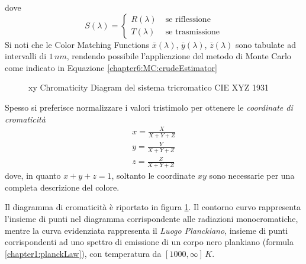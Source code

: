 dove
\begin{equation}\label{chapter2:colorimetry:spectrum2XYZ4Rad}
	S(\lambda) = \left\{ \begin{aligned}
		R(\lambda)\;&\text{se riflessione}\\
		T(\lambda)\;&\text{se trasmissione}
	\end{aligned}\right.
\end{equation}
Si noti che le Color Matching Functions $\bar{x}(\lambda)$, $\bar{y}(\lambda)$, $\bar{z}(\lambda)$ sono tabulate ad intervalli di $1\,\si{nm}$, 
rendendo possibile l'applicazione del metodo di Monte Carlo come indicato in Equazione \ref{chapter6:MC:crudeEstimator}
\begin{figure}[tb]
	
	\caption{xy Chromaticity Diagram del sistema tricromatico CIE XYZ 1931}
	\label{chapter2:colorimetry:cromaticityDiagram}
\end{figure}
Spesso si preferisce normalizzare i valori tristimolo per ottenere le \textit{coordinate di cromaticit\`a}
\begin{align}
	x = \frac{X}{X+Y+Z}\\
	y = \frac{Y}{X+Y+Z}\\
	z = \frac{Z}{X+Y+Z}
\end{align}
dove, in quanto $x+y+z=1$, soltanto le coordinate $xy$ sono necessarie per una completa descrizione del colore.\par
Il diagramma di cromaticit\`a \`e riportato in figura \ref{chapter2:colorimetry:cromaticityDiagram}. Il contorno curvo rappresenta l'insieme di punti
nel diagramma corrispondente alle radiazioni monocromatiche, mentre la curva evidenziata rappresenta il \textit{Luogo Planckiano}, insieme di punti
corrispondenti ad uno spettro di emissione di un corpo nero plankiano (formula \ref{chapter1:planckLaw}), con temperatura da $[1000,\infty]\,\si{K}$.
